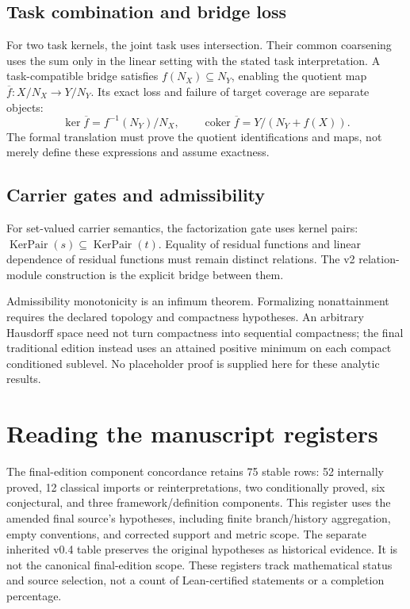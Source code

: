 \documentclass[11pt]{article}
\newcommand{\kerpair}{\operatorname{KerPair}}
\begin{document}
\subsection{Task combination and bridge loss}
For two task kernels, the joint task uses intersection. Their common
coarsening uses the sum only in the linear setting with the stated task
interpretation. A task-compatible bridge satisfies
\(f(N_X)\subseteq N_Y\), enabling the quotient map
\(\overline f:X/N_X\to Y/N_Y\). Its exact loss and failure of target coverage
are separate objects:
\[
 \ker\overline f=f^{-1}(N_Y)/N_X,
 \qquad\operatorname{coker}\overline f=Y/(N_Y+f(X)).
\]
The formal translation must prove the quotient identifications and maps,
not merely define these expressions and assume exactness.

\subsection{Carrier gates and admissibility}
For set-valued carrier semantics, the factorization gate uses kernel pairs:
\(\kerpair(s)\subseteq\kerpair(t)\). Equality of residual functions and
linear dependence of residual functions must remain distinct relations.
The v2 relation-module construction is the explicit bridge between them.

Admissibility monotonicity is an infimum theorem. Formalizing nonattainment
requires the declared topology and compactness hypotheses. An arbitrary
Hausdorff space need not turn compactness into sequential compactness;
the final traditional edition instead uses an attained positive minimum
on each compact conditioned sublevel.
No placeholder proof is supplied here for these analytic results.

\section{Reading the manuscript registers}
The final-edition component concordance retains 75 stable rows: 52 internally proved,
12 classical imports or reinterpretations, two conditionally proved,
six conjectural, and three framework/definition components. This register
uses the amended final source's hypotheses, including finite branch/history
aggregation, empty conventions, and corrected support and metric scope.
The separate inherited v0.4 table preserves the original hypotheses as
historical evidence. It is not the canonical final-edition scope.
These registers track mathematical status and source selection, not a count of
Lean-certified statements or a completion percentage.
\end{document}
